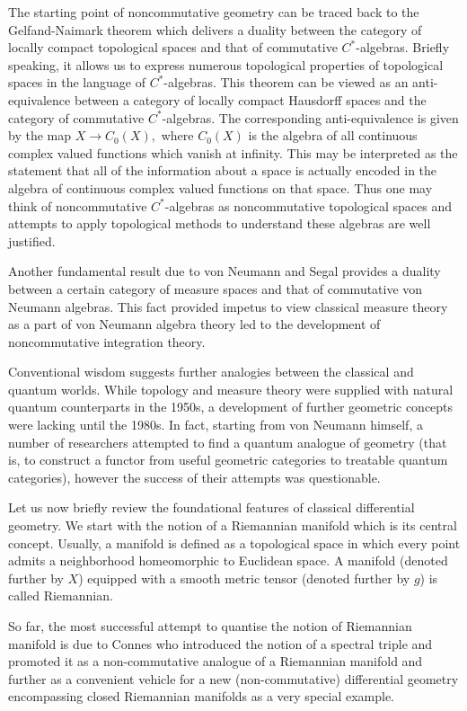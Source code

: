\documentclass[12pt]{article}
\begin{document}
The starting point of noncommutative geometry can be traced back to the Gelfand-Naimark theorem which delivers a duality between the category of locally compact topological spaces and that of commutative $C^{\ast}$-algebras. Briefly speaking, it allows us to express numerous topological properties of topological spaces in the language of $C^{\ast}$-algebras. This theorem can be viewed as an anti-equivalence between a category of locally compact Hausdorff spaces and the category of commutative $C^{\ast}$-algebras. The corresponding anti-equivalence is given by the map $X\to C_0(X),$ where $C_0(X)$ is the algebra of all continuous complex valued functions which vanish at infinity. This may be interpreted as the statement that all of the information about a space is actually encoded in the algebra of continuous complex valued functions on that space. Thus one may think of noncommutative $C^{\ast}$-algebras as noncommutative topological spaces and attempts to apply topological methods to understand these algebras are well justified. 

Another fundamental result due to von Neumann and Segal provides a duality between a certain category of measure spaces and that of commutative von Neumann algebras. This fact provided impetus to view classical measure theory as a part of von Neumann algebra theory led to the development of noncommutative integration theory.

Conventional wisdom suggests further analogies between the classical and quantum worlds. While topology and measure theory were supplied with natural quantum counterparts in the 1950s, a development of further geometric concepts were lacking until the 1980s. In fact, starting from von Neumann himself, a number of researchers attempted to find a quantum analogue of geometry (that is, to construct a functor from useful geometric categories to treatable quantum categories), however the success of their attempts was questionable.

Let us now briefly review the foundational features of classical differential geometry. We start with the notion of a Riemannian manifold which is its central concept. Usually, a manifold is defined as a topological space in which every point admits a neighborhood homeomorphic to Euclidean space. A manifold (denoted further by $X$) equipped with a smooth metric tensor (denoted further by $g$) is called Riemannian.

So far, the most successful attempt to quantise the notion of Riemannian manifold is due to Connes who introduced the notion of a spectral triple and promoted it as a non-commutative analogue of a Riemannian manifold and further as a convenient vehicle for a new (non-commutative) differential geometry encompassing closed Riemannian manifolds as a very special example.  
\end{document}
